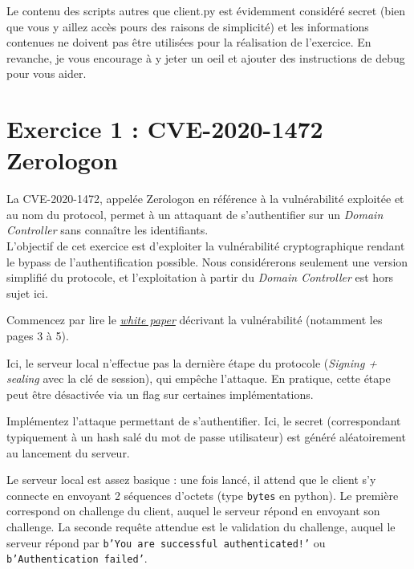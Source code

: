 \documentclass[french,a4paper,11pt]{exam}
\begin{document}
	Le contenu des scripts autres que client.py est évidemment considéré secret (bien que vous y aillez accès pours des raisons de simplicité) et les informations contenues ne doivent pas être utilisées pour la réalisation de l'exercice. En revanche, je vous encourage à y jeter un oeil et ajouter des instructions de debug pour vous aider.


	\section*{Exercice 1 : CVE-2020-1472 Zerologon}

	
	La CVE-2020-1472, appelée Zerologon en référence à la vulnérabilité exploitée et au nom du protocol, permet à un attaquant de s'authentifier 
	sur un \textit{Domain Controller} sans connaître les identifiants.\\
	L'objectif de cet exercice est d'exploiter la vulnérabilité cryptographique rendant le bypass de l'authentification possible. Nous considérerons seulement une version simplifié du protocole, et l'exploitation à partir du \textit{Domain Controller} est hors sujet ici.

	Commencez par lire le \href{https://www.secura.com/uploads/whitepapers/Zerologon.pdf}{\textit{white paper}} décrivant la vulnérabilité (notamment les pages 3 à 5).

	Ici, le serveur local n'effectue pas la dernière étape du protocole (\textit{Signing + sealing} avec la clé de session), qui empêche l'attaque. En pratique, cette étape peut être désactivée via un flag sur certaines implémentations.

	Implémentez l'attaque permettant de s'authentifier. Ici, le secret (correspondant typiquement à un hash salé du mot de passe utilisateur) est généré aléatoirement au lancement du serveur.

	\begin{center}
	\end{center}

	Le serveur local est assez basique : une fois lancé, il attend que le client s'y connecte en envoyant 2 séquences d'octets (type \texttt{bytes} en python). Le première correspond on challenge du client, auquel le serveur répond en envoyant son challenge. La seconde requête attendue est le validation du challenge, auquel le serveur répond par \texttt{b'You are successful authenticated!'} ou \texttt{b'Authentication failed'}.
\end{document}
